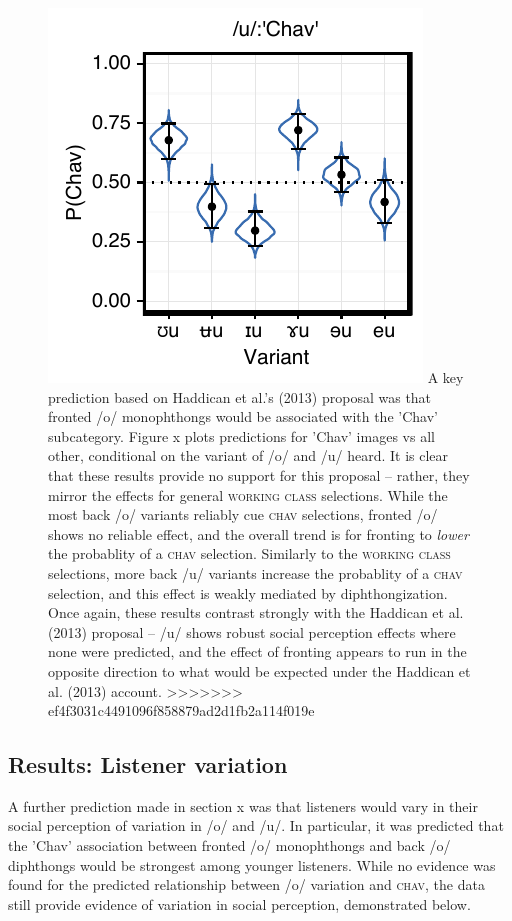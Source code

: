 \documentclass[PWPL]{article}
\begin{document}
\begin{figure}[ht]
\includegraphics[scale=0.8]{uw_chav.pdf}
A key prediction based on Haddican et al.'s (2013) proposal was that fronted /o/ monophthongs would be associated with the 'Chav' subcategory. Figure x plots predictions for 'Chav' images vs all other, conditional on the variant of /o/ and /u/ heard. It is clear that these results provide no support for this proposal -- rather, they mirror the effects for general  \textsc{working class} selections. While the most back /o/ variants reliably cue \textsc{chav} selections, fronted /o/ shows no reliable effect, and the overall trend is for fronting to \textit{lower} the probablity of a \textsc{chav} selection. Similarly to the \textsc{working class} selections, more back /u/ variants increase the probablity of a \textsc{chav} selection, and this effect is weakly mediated by diphthongization. Once again, these results contrast strongly with the Haddican et al. (2013) proposal -- /u/ shows robust social perception effects where none were predicted, and the effect of fronting appears to run in the opposite direction to what would be expected under the Haddican et al. (2013) account.
>>>>>>> ef4f3031c4491096f858879ad2d1fb2a114f019e
\end{figure}
\subsection{Results: Listener variation}
A further prediction made in section x was that listeners would vary in their social perception of variation in /o/ and /u/. In particular, it was predicted that the 'Chav' association between fronted /o/ monophthongs and back /o/ diphthongs would be strongest among younger listeners. While no evidence was found for the predicted relationship between /o/ variation and \textsc{chav}, the data still provide evidence of variation in social perception, demonstrated below.
\end{document}
